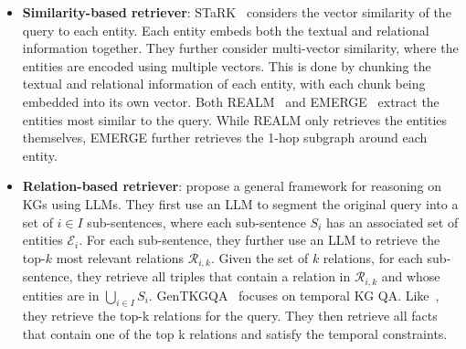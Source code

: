 \begin{itemize}[leftmargin=*]
    \item {\bf Similarity-based retriever}: STaRK~\cite{wu2024stark} considers the vector similarity of the query to each entity. Each entity embeds both the textual and relational information together. They further consider multi-vector similarity, where the entities are encoded using multiple vectors. This is done by chunking the textual and relational information of each entity, with each chunk being embedded into its own vector. Both REALM~\cite{zhu2024realm} and EMERGE~\cite{zhu2024emerge} extract the entities most similar to the query. While REALM only retrieves the entities themselves, EMERGE further retrieves the 1-hop subgraph around each entity.
    

    \item {\bf Relation-based retriever}: \citet{kim2023kg} propose a general framework for reasoning on KGs using LLMs. They first use an LLM to segment the original query into a set of $i \in I$ sub-sentences, where each sub-sentence $S_i$ has an associated set of entities $\mathcal{E}_i$. For each sub-sentence, they further use an LLM to retrieve the top-$k$ most relevant relations $\mathcal{R}_{i, k}$. Given the set of $k$ relations, for each sub-sentence, they retrieve all triples that contain a relation in $\mathcal{R}_{i, k}$ and whose entities are in $\bigcup_{i \in I} S_i$. GenTKGQA~\cite{gao2024two} focuses on temporal KG QA. Like~\cite{kim2023kg}, they retrieve the top-k relations for the query. They then retrieve all facts that contain one of the top k relations and satisfy the temporal constraints. 


\end{itemize}
